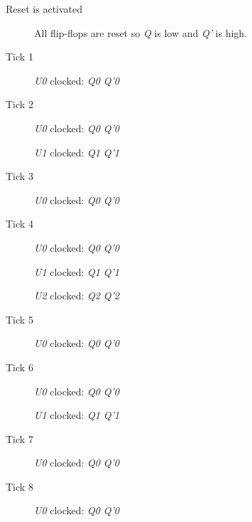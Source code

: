 \begin{description}
	\item [Reset is activated] All flip-flops are reset so \textit{Q} is low and \textit{Q'} is high.
	
	\item [Tick 1] \textit{U0} clocked: \textit{Q0} \textuparrow \: \textemdash \: \textit{Q'0} \textdownarrow
	
	\item [Tick 2] \textit{U0} clocked: \textit{Q0} \textdownarrow \: \textemdash \: \textit{Q'0} \textuparrow
	
	\hspace{14pt}\textit{U1} clocked: \textit{Q1} \textuparrow \: \textemdash \: \textit{Q'1} \textdownarrow
	
	\item [Tick 3] \textit{U0} clocked: \textit{Q0} \textuparrow \: \textemdash \: \textit{Q'0} \textdownarrow
	
	\item [Tick 4] \textit{U0} clocked: \textit{Q0} \textdownarrow \: \textemdash \: \textit{Q'0} \textuparrow
	
	\hspace{14pt}\textit{U1} clocked: \textit{Q1} \textdownarrow \: \textemdash \: \textit{Q'1} \textuparrow
	
	\hspace{14pt}\textit{U2} clocked: \textit{Q2} \textuparrow \: \textemdash \: \textit{Q'2} \textdownarrow
	
	\item [Tick 5] \textit{U0} clocked: \textit{Q0} \textuparrow \: \textemdash \: \textit{Q'0} \textdownarrow
	
	\item [Tick 6] \textit{U0} clocked: \textit{Q0} \textdownarrow \: \textemdash \: \textit{Q'0} \textuparrow
	
	\hspace{14pt}\textit{U1} clocked: \textit{Q1} \textuparrow \: \textemdash \: \textit{Q'1} \textdownarrow
	
	\item [Tick 7] \textit{U0} clocked: \textit{Q0} \textuparrow \: \textemdash \: \textit{Q'0} \textdownarrow
	
	\item [Tick 8] \textit{U0} clocked: \textit{Q0} \textdownarrow \: \textemdash \: \textit{Q'0} \textuparrow
	

\end{description}
